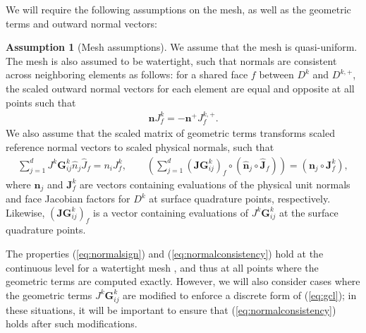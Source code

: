 \documentclass[preprint,10pt]{article}
\theoremstyle{definition}
\theoremstyle{lemma}
\theoremstyle{theorem}
\theoremstyle{assumption}
\newtheorem{assumption}{Assumption}
\renewcommand{\hat}{\widehat}
\newcommand{\LRp}[1]{\left( #1 \right)}
\newcommand{\lcwnote}[1]{{\color{gray}{#1}}}
\begin{document}
{We will require the following assumptions on the mesh, as well as the geometric terms and outward normal vectors:
\begin{assumption}[Mesh assumptions]
We assume that the mesh is quasi-uniform.  The mesh is also assumed to be watertight, such that normals are consistent across neighboring elements as follows: for a shared face $f$ between $D^k$ and $D^{k,+}$, the scaled outward normal vectors for each element are equal and opposite at all points such that 
\begin{align}
\bm{n}J^k_f = -\bm{n}^+J^{k,+}_f.
\label{eq:normalsign}
\end{align}
We also assume that the scaled matrix of geometric terms transforms scaled reference normal vectors to scaled physical normals, such that
\begin{align}
\sum_{j=1}^d J^k\bm{G}^k_{ij} \hat{n}_j\hat{J}_f = n_i J^k_f, \qquad \LRp{\sum_{j=1}^d \LRp{\bm{JG}^k_{ij}}_f \circ\LRp{\hat{\bm{n}}_j\circ\hat{\bm{J}}_f}}
= \LRp{\bm{n}_j\circ\bm{J}^k_f},
\label{eq:normalconsistency}
\end{align}
where $\bm{n}_j$ and $\bm{J}^k_f$ are vectors containing evaluations of the physical unit normals and face Jacobian factors for $D^k$ at surface quadrature points, respectively.
Likewise, $\LRp{\bm{JG}^k_{ij}}_f$ \lcwnote{(This could be written as $\bm{J}_f^{\bm{G}^k_{ij}}$.)} is a vector containing evaluations of $J^k\bm{G}^k_{ij}$ at the surface quadrature points.
\label{ass:norm}
\end{assumption}
The properties (\ref{eq:normalsign}) and (\ref{eq:normalconsistency}) hold at the continuous level for a watertight mesh \cite{ciarlet1978finite}, and thus at all points where the geometric terms are computed exactly.  However, we will also consider cases where the geometric terms $J^k\bm{G}^k_{ij}$ are modified to enforce a discrete form of (\ref{eq:gcl}); in these situations, it will be important to ensure that (\ref{eq:normalconsistency}) holds after such modifications.  

}
\end{document}
